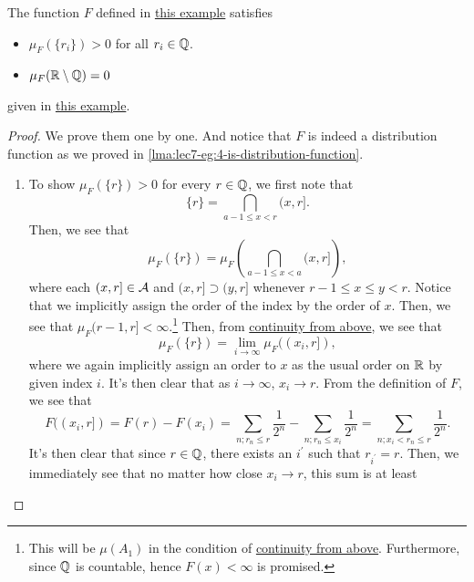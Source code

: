 \begin{lemma}\label{lma:lec8-eg:3}
	The function \(F\) defined in \hyperref[eg:lec8-3]{this example} satisfies
	\begin{itemize}
		\item \(\mu _F(\{r_{i}\})>0\) for all \(r_{i}\in\mathbb{\MakeUppercase{q}} \).
		\item \(\mu _F(\mathbb{\MakeUppercase{r}} \setminus \mathbb{\MakeUppercase{q}} ) = 0\)
	\end{itemize}
	given in \hyperref[eg:lec8-3]{this example}.
\end{lemma}
\begin{proof}
	We prove them one by one. And notice that \(F\) is indeed a distribution function as we proved in \autoref{lma:lec7-eg:4-is-distribution-function}.
	\begin{enumerate}
		\item To show \(\mu _{F}(\{r\}) > 0\) for every \(r\in \mathbb{\MakeUppercase{q}} \), we first note that
		      \[
			      \{r\} = \bigcap\limits_{a-1\leq x< r}(x, r].
		      \]
		      Then, we see that
		      \[
			      \mu _{F}(\{r\}) = \mu _{F}\left(\bigcap\limits_{a-1\leq x<a} (x, r]\right),
		      \]
		      where each \((x, r]\in\mathcal{\MakeUppercase{a}} \) and \((x, r]\supset (y, r]\) whenever \(r-1\leq x \leq y<r\). Notice that we implicitly
		      assign the order of the index by the order of \(x\). Then, we see that \(\mu _{F}(r-1, r]<\infty \).\footnote{This will be \(\mu (A_1)\) in the condition of \hyperref[thm:measure-space-continuity-from-above]{continuity from above}. Furthermore, since \(\mathbb{\MakeUppercase{q}} \) is countable, hence \(F(x)<\infty \) is promised.}
		      Then, from \hyperref[thm:measure-space-continuity-from-above]{continuity from above}, we see that
		      \[
			      \mu _{F}(\{r\}) = \lim\limits_{i \to \infty} \mu _{F}((x_{i}, r]),
		      \]
		      where we again implicitly assign an order to \(x\) as the usual order on \(\mathbb{\MakeUppercase{r}}\) by given index \(i\). It's then clear
		      that as \(i\to \infty \), \(x_{i}\to r\). From the definition of \(F\), we see that
		      \[
			      F((x_{i}, r]) = F(r) - F(x_{i}) = \sum\limits_{n;r_{n}\leq r} \frac{1}{2^n} - \sum\limits_{n;r_{n}\leq x_{i}} \frac{1}{2^n} = \sum\limits_{n;x_{i}<r_{n}\leq r}\frac{1}{2^n}.
		      \]
		      It's then clear that since \(r\in \mathbb{\MakeUppercase{q}} \), there exists an \(i ^\prime \) such that \(r_{i ^\prime } = r\). Then, we immediately see
		      that no matter how close \(x_{i}\to r\), this sum is at least

\end{enumerate}
\end{proof}
